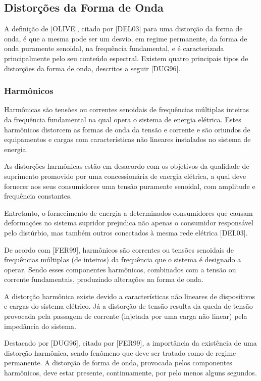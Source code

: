 \subsection{Distorções da Forma de Onda}
\par 
A definição de [OLIVE], citado por [DEL03] para uma distorção da forma de onda, é que a mesma pode ser um desvio, em regime permanente, da forma de onda puramente senoidal, na frequência fundamental, e é caracterizada principalmente pelo seu conteúdo espectral. Existem quatro principais tipos de distorções da forma de onda, descritos a seguir [DUG96].
\subsubsection{Harmônicos}
\par
Harmônicas são tensões ou correntes senoidais de frequências múltiplas inteiras da frequência fundamental na qual opera o sistema de energia elétrica. Estes harmônicos distorcem as formas de onda da tensão e corrente e são oriundos de equipamentos e cargas com características não lineares instalados no sistema de energia. 
\par
As distorções harmônicas estão em desacordo com os objetivos da qualidade de suprimento promovido por uma concessionária de energia elétrica, a qual deve fornecer aos seus consumidores uma tensão puramente senoidal, com amplitude e frequência constantes. \par
\par
Entretanto, o fornecimento de energia a determinados consumidores que causam deformações no sistema supridor prejudica não apenas o consumidor responsável pelo distúrbio, mas também outros conectados à mesma rede elétrica [DEL03].
\par
De acordo com [FER99], harmônicos são correntes ou tensões senoidais de frequências múltiplas (de inteiros) da frequência que o sistema é designado a operar. Sendo esses componentes harmônicos, combinados com a tensão ou corrente fundamentais, produzindo alterações na forma de onda. 
\par
A distorção harmônica existe devido a características não lineares de dispositivos e cargas do sistema elétrico. Já a distorção de tensão resulta da queda de tensão provocada pela passagem de corrente (injetada por uma carga não linear) pela impedância do sistema.
\par
Destacado por [DUG96], citado por [FER99], a importância da existência de uma distorção harmônica, sendo fenômeno que deve ser tratado como de regime permanente. A distorção de forma de onda, provocada pelos componentes harmônicos, deve estar presente, continuamente, por pelo menos alguns segundos.

